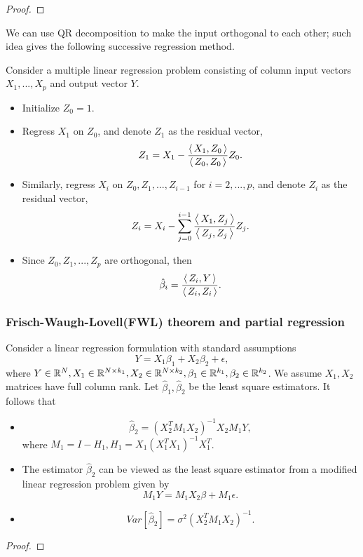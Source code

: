 \begin{refsection}
\begin{proof}
\end{proof}	


\begin{remark}
We can use QR decomposition to make the input orthogonal to each other; such idea gives the following successive regression method.
\end{remark}



\begin{method}
Consider a multiple linear regression problem consisting of column input vectors $X_1,...,X_p$ and output vector $Y$.	
\begin{itemize}
	\item Initialize $Z_0 = 1$.
	\item Regress $X_1$ on $Z_0$, and denote $Z_1$ as the residual vector,
	$$Z_1 = X_1 - \frac{{\left< \, X_1,Z_0 \, \right>}}{{\left< \, Z_0,Z_0 \, \right>}}Z_0.$$
	\item Similarly, regress $X_i$ on $Z_0,Z_1,...,Z_{i-1}$ for $i=2,...,p$, and denote $Z_i$ as the residual vector,
	$$Z_i = X_i - \sum_{j=0}^{i-1}\frac{{\left< \, X_1,Z_j \, \right>}}{{\left< \, Z_j,Z_j \, \right>}}Z_j.$$
	
	\item Since $Z_0,Z_1,...,Z_p$ are orthogonal, then 
	$$\hat{\beta}_i =  \frac{ {\left< \, Z_i,Y \, \right>}}{{\left< \, Z_i,Z_i \, \right>}}.$$
\end{itemize}
\end{method}


\subsubsection{Frisch-Waugh-Lovell(FWL) theorem and partial regression}


\begin{theorem}\label{ch:regression-analysis:th:LinearRegressionPartialRegressionFrisch-Waugh-LovellTheorem}
Consider a linear regression formulation with standard assumptions
$$Y = X_1\beta_1 + X_2\beta_2 + \epsilon,$$
where $Y\in \mathbb{R}^N, X_1\in \mathbb{R}^{N\times k_1}, X_2\in \mathbb{R}^{N\times k_2}, \beta_1\in\mathbb{R}^{k_1}, \beta_2\in \mathbb{R}^{k_2}$. We assume $X_1,X_2$ matrices have full column rank. Let $\hat{\beta}_1,\hat{\beta}_2$ be the least square estimators.
It follows that
\begin{itemize}
	\item $$\hat{\beta}_2 = (X_2^TM_1X_2)^{-1}X_2M_1Y,$$
	where $M_1 = I - H_1, H_1 = X_1(X_1^TX_1)^{-1}X_1^T$.
	\item The estimator $\hat{\beta}_2$ can be viewed as the least square estimator from a modified linear regression problem given by
	$$M_1Y = M_1X_2 \beta + M_1\epsilon.$$
	\item $$Var[\hat{\beta}_2] = \sigma^2 (X_2^TM_1X_2)^{-1}. $$
\end{itemize}	
\end{theorem}
\begin{proof}


\end{proof}
\end{refsection}
